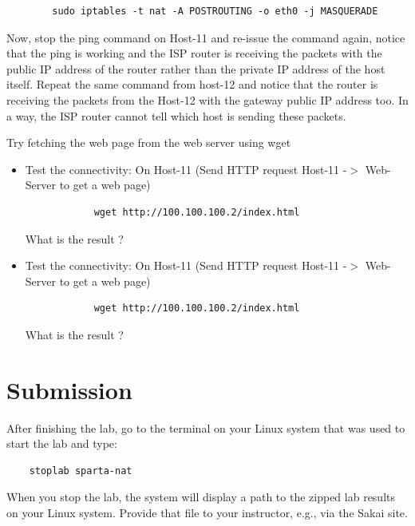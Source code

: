 \begin{verbatim}
		sudo iptables -t nat -A POSTROUTING -o eth0 -j MASQUERADE
\end{verbatim}

Now, stop the ping command on Host-11 and re-issue the command again, notice that the ping is working and the ISP router is receiving the packets with the public IP address of the router rather than the private IP address of the host itself.
\newline
\newline
Repeat the same command from host-12 and notice that the router is receiving the packets from the Host-12 with the gateway public IP address too.
\newline
\newline
In a way, the ISP router cannot tell which host is sending these packets.

Try fetching the web page from the web server using wget
\begin{itemize}
	\item Test the connectivity: On Host-11 (Send HTTP request Host-11 -$>$ Web-Server to get a web page)
	\begin{verbatim}
			wget http://100.100.100.2/index.html
	\end{verbatim}

	What is the result ?

	\item Test the connectivity: On Host-11 (Send HTTP request Host-11 -$>$ Web-Server to get a web page)
	\begin{verbatim}
			wget http://100.100.100.2/index.html
	\end{verbatim}

	What is the result ?
\end{itemize}

\section{Submission}
After finishing the lab, go to the terminal on your Linux system that was used to start the lab and type:
\begin{verbatim}
    stoplab sparta-nat
\end{verbatim}
When you stop the lab, the system will display a path to the zipped lab results on your Linux system.  Provide that file to
your instructor, e.g., via the Sakai site.


